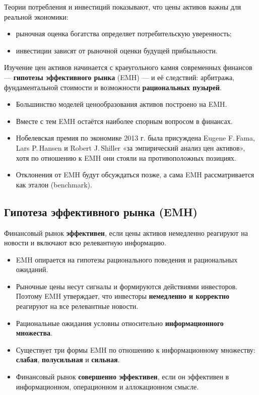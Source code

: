 \documentclass[10pt,a4paper]{article}
\begin{document}
Теории потребления и инвестиций показывают, что цены активов важны для реальной экономики:
\begin{itemize}[leftmargin=1.3em]
\item рыночная оценка богатства определяет потребительскую уверенность;
\item инвестиции зависят от рыночной оценки будущей прибыльности.
\end{itemize}

Изучение цен активов начинается с краеугольного камня современных финансов — \textbf{гипотезы эффективного рынка} (EMH) — и её следствий: арбитража, фундаментальной стоимости и возможности \textbf{рациональных пузырей}.
\begin{itemize}[leftmargin=1.3em]
\item Большинство моделей ценообразования активов построено на EMH.
\item Вместе с тем EMH остаётся наиболее спорным вопросом в финансах.
\item Нобелевская премия по экономике 2013 г. была присуждена Eugene F.\,Fama, Lars P.\,Hansen и Robert J.\,Shiller «за эмпирический анализ цен активов», хотя по отношению к EMH они стояли на противоположных позициях.
\item Отклонения от EMH будут обсуждаться позже, а сама EMH рассматривается как эталон (benchmark).
\end{itemize}

\subsection{Гипотеза эффективного рынка (EMH)}

Финансовый рынок \textbf{эффективен}, если цены активов немедленно реагируют на новости и включают всю релевантную информацию.
\begin{itemize}[leftmargin=1.3em]
\item EMH опирается на гипотезы рационального поведения и рациональных ожиданий.
\item Рыночные цены несут сигналы и формируются действиями инвесторов. Поэтому EMH утверждает, что инвесторы \textbf{немедленно и корректно} реагируют на все релевантные новости.
\item Рациональные ожидания условны относительно \textbf{информационного множества}.
\item Существует три формы EMH по отношению к информационному множеству: \textbf{слабая}, \textbf{полусильная} и \textbf{сильная}.
\item Финансовый рынок \textbf{совершенно эффективен}, если он эффективен в информационном, операционном и аллокационном смысле.
\end{itemize}
\end{document}
